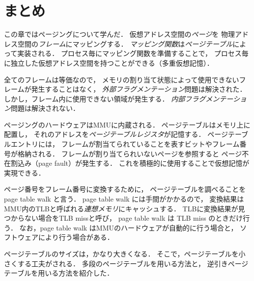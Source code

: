 \section{まとめ}
この章ではページングについて学んだ．
仮想アドレス空間の\emph{ページ}を
物理アドレス空間の\emph{フレーム}にマッピングする．
\emph{マッピング関数}は\emph{ページテーブル}によって実装される．
プロセス毎にマッピング関数を準備することで，
プロセス毎に独立した仮想アドレス空間を持つことができる（多重仮想記憶）．

全てのフレームは等価なので，
メモリの割り当て状態によって使用できないフレームが発生することはなく，
\emph{外部フラグメンテーション}問題は解決された．
しかし，フレーム内に使用できない領域が発生する．
\emph{内部フラグメンテーション}問題は解決されない．

ページングのハードウェアはMMUに内蔵される．
ページテーブルはメモリ上に配置し，
それのアドレスを\emph{ページテーブルレジスタ}が記憶する．
ページテーブルエントリには，
フレームが割当てられていることを表すビットやフレーム番号が格納される．
フレームが割り当てられいないページを参照すると
ページ不在割込み（page fault）が発生する．
これを積極的に使用することで仮想記憶が実現できる．

ページ番号をフレーム番号に変換するために，
ページテーブルを調べることを page table walk と言う．
page table walk には手間がかかるので，
変換結果はMMU内のTLBと呼ばれる\emph{連想メモリ}にキャッシュする．
TLBに変換結果が見つからない場合をTLB missと呼び，
page table walk は TLB miss のときだけ行う．
なお，page table walk はMMUのハードウェアが自動的に行う場合と，
ソフトウェアにより行う場合がある．

ページテーブルのサイズは，かなり大きくなる．
そこで，ページテーブルを小さくする工夫がされる．
多段のページテーブルを用いる方法と，
逆引きページテーブルを用いる方法を紹介した．

